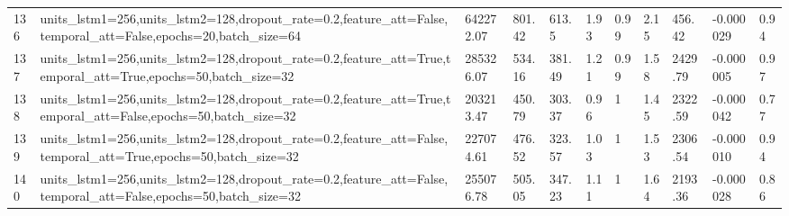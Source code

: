 \begin{longtable}{C{0.8cm} L{2cm} C{1.15cm} C{1.15cm} C{1.15cm} C{1.15cm} C{0.85cm} C{1.25cm} C{1.2cm} C{1.5cm} C{1.0cm}}
136 & units\_lstm1=256,\newline units\_lstm2=128,\newline dropout\_rate=0.2,\newline feature\_att=False,\newline temporal\_att=False,\newline epochs=20,\newline batch\_size=64 & 642272.07 & 801.42 & 613.5 & 1.93 & 0.99 & 2.15 & 456.42 & -0.000029 & 0.94 \\
137 & units\_lstm1=256,\newline units\_lstm2=128,\newline dropout\_rate=0.2,\newline feature\_att=True,\newline temporal\_att=True,\newline epochs=50,\newline batch\_size=32 & 285326.07 & 534.16 & 381.49 & 1.21 & 0.99 & 1.58 & 2429.79 & -0.000005 & 0.97 \\
138 & units\_lstm1=256,\newline units\_lstm2=128,\newline dropout\_rate=0.2,\newline feature\_att=True,\newline temporal\_att=False,\newline epochs=50,\newline batch\_size=32 & 203213.47 & 450.79 & 303.37 & 0.96 & 1 & 1.45 & 2322.59 & -0.000042 & 0.77 \\
139 & units\_lstm1=256,\newline units\_lstm2=128,\newline dropout\_rate=0.2,\newline feature\_att=False,\newline temporal\_att=True,\newline epochs=50,\newline batch\_size=32 & 227074.61 & 476.52 & 323.57 & 1.03 & 1 & 1.53 & 2306.54 & -0.000010 & 0.94 \\
140 & units\_lstm1=256,\newline units\_lstm2=128,\newline dropout\_rate=0.2,\newline feature\_att=False,\newline temporal\_att=False,\newline epochs=50,\newline batch\_size=32 & 255076.78 & 505.05 & 347.23 & 1.11 & 1 & 1.64 & 2193.36 & -0.000028 & 0.86 \\

\end{longtable}
